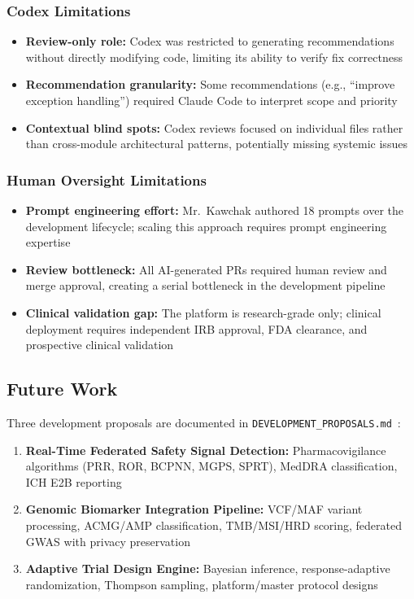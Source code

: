 \documentclass[10pt]{article}
\begin{document}
\subsubsection{Codex Limitations}
\begin{itemize}
  \item \textbf{Review-only role:} Codex was restricted to generating recommendations without directly modifying code, limiting its ability to verify fix correctness
  \item \textbf{Recommendation granularity:} Some recommendations (e.g., ``improve exception handling'') required Claude Code to interpret scope and priority
  \item \textbf{Contextual blind spots:} Codex reviews focused on individual files rather than cross-module architectural patterns, potentially missing systemic issues
\end{itemize}

\subsubsection{Human Oversight Limitations}
\begin{itemize}
  \item \textbf{Prompt engineering effort:} Mr.\ Kawchak authored 18 prompts over the development lifecycle; scaling this approach requires prompt engineering expertise
  \item \textbf{Review bottleneck:} All AI-generated PRs required human review and merge approval, creating a serial bottleneck in the development pipeline
  \item \textbf{Clinical validation gap:} The platform is research-grade only; clinical deployment requires independent IRB approval, FDA clearance, and prospective clinical validation
\end{itemize}

\subsection{Future Work}

Three development proposals are documented in \texttt{DEVELOPMENT\_PROPOSALS.md}~\cite{kawchak2026fl}:
\begin{enumerate}
  \item \textbf{Real-Time Federated Safety Signal Detection:} Pharmacovigilance algorithms (PRR, ROR, BCPNN, MGPS, SPRT), MedDRA classification, ICH E2B reporting
  \item \textbf{Genomic Biomarker Integration Pipeline:} VCF/MAF variant processing, ACMG/AMP classification, TMB/MSI/HRD scoring, federated GWAS with privacy preservation
  \item \textbf{Adaptive Trial Design Engine:} Bayesian inference, response-adaptive randomization, Thompson sampling, platform/master protocol designs
\end{enumerate}
\end{document}
